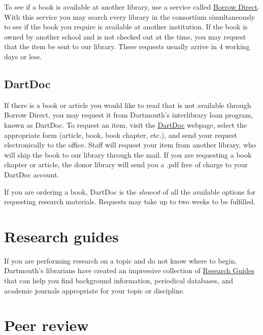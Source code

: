 To see if a book is available at another library, use a  service called
\href{http://www.dartmouth.edu/~library/res-share/borrowdirect/}{Borrow Direct}.
With this  service you may search every library in the consortium simultaneously
to see if the  book you require is available at another institution. If the book
is  owned by another school and is not checked out at the time, you may request
that the item be sent to our library. These requests usually arrive in 4 working
days or less.

\hypertarget{peer-review}{}

\subsection{DartDoc} If there is a book or article you would like to read that
is not available through Borrow Direct, you may request it from Dartmouth's
interlibrary loan program, known as DartDoc. To  request an item, visit the
\href{https://dartmouth.illiad.oclc.org/illiad/berry/logon.html}{DartDoc}
webpage, select the appropriate form (article, book, book chapter, etc.), and
send your request electronically to the office. Staff will
request your item from another library, who will ship the book to our library
through the mail. If you are requesting a book chapter or article, the donor
library will send you a .pdf free of charge to your DartDoc account.

\begin{center}
\begin{tcolorbox}[colframe=oyster, coltitle=black, sharp corners, title=\ding{52} Note]
If you are ordering a book, DartDoc is the
\emph{slowest} of all the  available options for requesting research materials.
Requests may take up to  two weeks to be fulfilled.
\end{tcolorbox}
\end{center}

\section{Research guides}


If you are performing research on a topic and do not know where to begin,
Dartmouth's librarians have created an impressive collection of
\href{http://researchguides.dartmouth.edu}{Research Guides} that can help you
find background information, periodical databases, and  academic journals
appropriate for your topic or discipline.


\section{Peer review}

